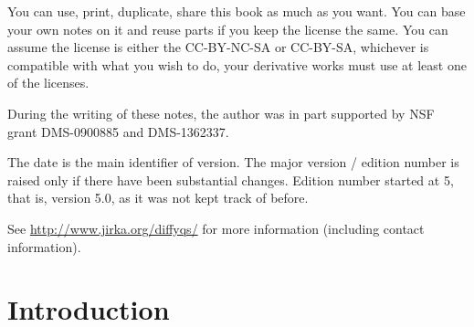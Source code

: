 \documentclass[12pt]{book}
\begin{document}
\bigskip

\noindent
You can use, print, duplicate, share this book as much as you want.  You can
base your own notes on it and reuse parts if you keep the license the
same.  You can assume the license is either the CC-BY-NC-SA or CC-BY-SA,
whichever is compatible with what you wish to do, your derivative works must
use at least one of the licenses.

\bigskip

\noindent
During the writing of these notes, 
the author was in part supported by NSF grant DMS-0900885 and
DMS-1362337.

\bigskip

\noindent
The date is the main identifier of version.  The major version / edition
number is raised only if there have been substantial changes.
Edition
number started at 5, that is, version 5.0, as it was not kept track of
before.

\bigskip

\noindent
See \url{http://www.jirka.org/diffyqs/} for more information
(including contact information).


\diffytableofcontents

\newpage




\chapter*{Introduction} \label{intro:chapter}
\end{document}
